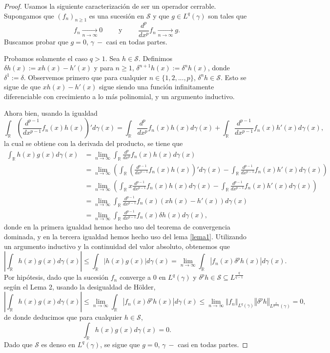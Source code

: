 \documentclass[letterpaper,twoside,12pt]{book}
\newcommand{\R}{\mathbb{R}}
\renewcommand{\S}{\mathcal{S}}
\newcommand{\1}{\mathds{1}}
\newcommand{\abs}[1]{\left\lvert #1 \right\rvert}
\renewcommand{\to}{\rightarrow}
\newcommand{\norm}[1]{\left\Vert #1 \right\Vert}
\theoremstyle{definition}
\theoremstyle{definition}
\theoremstyle{remark}
\theoremstyle{definition}
\theoremstyle{definition}
\theoremstyle{definition}
\theoremstyle{definition}
\theoremstyle{definition}
\begin{document}
\begin{proof} 
  Usamos la siguiente caracterización de ser un operador cerrable. Supongamos que $(f_n)_{n\geq1}$ es una sucesión en $\S$ y que $g\in L^{q}(\gamma)$ son tales que 
  \[
  f_n\xrightarrow[n\to \infty]{}0 \qquad \text{ y } \qquad \frac{d^{p}}{dx^{p}}f_n\xrightarrow[n\to \infty]{}g.
  \] 
   Buscamos probar que $g=0$, $\gamma \ - $ casi en todas partes.
   
   Probamos solamente el caso $q>1$. Sea $h\in \S$. Definimos $\delta h(x):=xh(x)-h'(x)$ y para $n\geq1$, $\delta^{n+1}h(x):=\delta^{n} h(x)$, donde $\delta^{1}:=\delta$. Observemos primero que para cualquier $n\in \{1,2,...,p\}$, $\delta^{n}h\in \S$. Esto se sigue de que $xh(x)-h'(x)$ sigue siendo una función infinitamente diferenciable con crecimiento a lo más polinomial, y un argumento inductivo.
   
   Ahora bien, usando la igualdad
   \[
   \int_\R \left(\frac{d^{p-1}}{dx^{p-1}}f_n(x)h(x)\right)'d\gamma(x)=\int_\R \frac{d^{p}}{dx^{p}}f_n(x)h(x)d\gamma(x) +\int _\R \frac{d^{p-1}}{dx^{p-1}}f_n(x)h'(x)d\gamma(x),
   \] 
   la cual se obtiene con la derivada del producto, se tiene que 
   \begin{align*}
       \int_{\R}h(x)g(x)d\gamma(x)&=\lim_{n\to\infty}\int_\R \frac{d^{p}}{dx^{p}}f_n(x) h(x) d\gamma(x)\\
       &=\lim_{n\to\infty}\left(\int_\R \left(\frac{d^{p-1}}{dx^{p-1}}f_n(x)h(x)\right)'d\gamma(x)-\int _\R \frac{d^{p-1}}{dx^{p-1}}f_n(x)h'(x)d\gamma(x)\right)\\
       &=\lim_{n\to\infty}\left(\int_\R x\frac{d^{p-1}}{dx^{p-1}}f_n(x)h(x)d\gamma(x)-\int _\R \frac{d^{p-1}}{dx^{p-1}}f_n(x)h'(x)d\gamma(x)\right)\\
       &=\lim_{n\to\infty}\int_\R \frac{d^{p-1}}{dx^{p-1}}f_n(x) \left(xh(x)-h'(x)\right) d\gamma(x)\\
       &=\lim_{n\to\infty}\int_\R \frac{d^{p-1}}{dx^{p-1}}f_n(x) \delta h(x) d\gamma(x),
   \end{align*}
   donde en la primera igualdad hemos hecho uso del teorema de convergencia dominada, y en la tercera igualdad hemos hecho uso del lema \ref{lema1}. Utilizando un argumento inductivo y la continuidad del valor absoluto, obtenemos que 
   \[
       \abs{\int_{\R}h(x)g(x)d\gamma(x)}\leq\int_{\R}\abs{h(x)g(x)} d\gamma(x)=\lim_{n\to\infty}\int_\R \abs{f_n(x) \delta^{p} h(x)} d\gamma(x).
   \]
   Por hipótesis, dado que la sucesión $f_n$ converge a 0 en $L^{q}(\gamma)$ y $\delta^{p}h \in \S\subseteq L^{\frac{q}{q-1}}$ según el Lema 2, usando la desigualdad de Hölder, 
    \[
       \abs{\int_{\R}h(x)g(x)d\gamma(x)}\leq\lim_{n\to\infty}\int_\R |f_n(x) \delta^{p} h(x)| d\gamma(x)\leq \lim_{n\to \infty}\norm{f_n}_{L^{q}(\gamma)}\norm{\delta^{p}h}_{L^{\frac{q}{q-1}}(\gamma)}=0,
    \]
    de donde deducimos que para cualquier $h\in \S$, 
    \[
      \int_{\R}h(x)g(x)d\gamma(x)=0.
      \]
      Dado que $\S$ es denso en $L^{q}(\gamma)$, se sigue que $g=0$, $\gamma \ - $ casi en todas partes.
      
   \end{proof}
\end{document}
